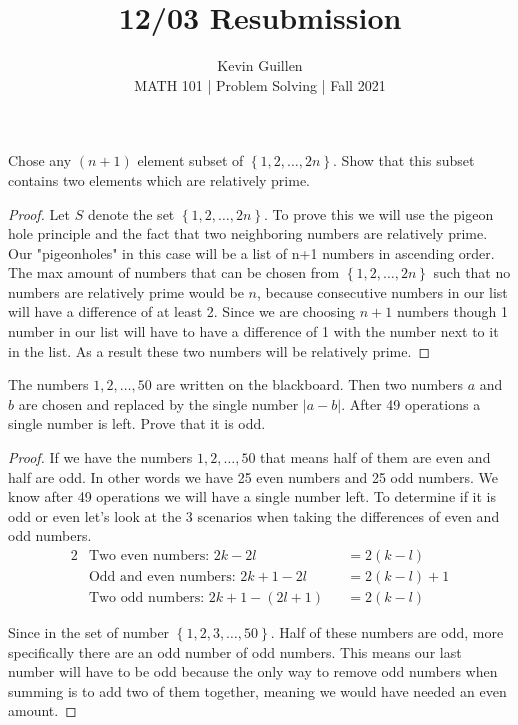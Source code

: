 \documentclass[11pt]{article}
\newenvironment{problem}[2][Problem\!]{\begin{trivlist}
\item[\hskip \labelsep {\bfseries #1}\hskip \labelsep {\bfseries #2}]}{\end{trivlist}}
\newcommand{\abs}[1]{\left\lvert#1\right\rvert} %
\newcommand{\set}[1]{\left\{#1\right\}} %
\begin{document}
 
\title{12/03 Resubmission}
\author{Kevin Guillen\\[0.5em]
MATH 101 | Problem Solving | Fall 2021}
\date{} 
\maketitle


\begin{tcolorbox}
    \begin{problem}{10/8 | OC | 30. }
        Chose any $(n+1)$ element subset of $\set{1,2,\dots, 2n}$. Show that this subset contains two elements which are relatively prime. 
    \end{problem}
\end{tcolorbox}
\begin{proof}
    Let $S$ denote the set $\set{1,2,\dots,2n}$. To prove this we will use the pigeon hole principle and the fact that two neighboring numbers are relatively prime. Our "pigeonholes" in this case will be a list of n+1 numbers in ascending order.  The max amount of numbers that can be chosen from $\set{1,2, \dots , 2n}$ such that no numbers are relatively prime would be $n$, because consecutive numbers in our list will have a difference of at least 2. Since we are choosing $n+1$ numbers though 1 number in our list will have to have a difference of 1 with the number next to it in the list. As a result these two numbers will be relatively prime. 
\end{proof}

\begin{tcolorbox}
    \begin{problem}{10/11 IC (44.)} 
        The numbers $1,2,\dots, 50$ are written on the blackboard. Then two numbers $a$ and $b$ are chosen and replaced by the single number $\abs{a-b}$. After 49 operations a single number is left. Prove that it is odd. 
    \end{problem}
\end{tcolorbox}

\begin{proof}
    If we have the numbers $1,2,\dots, 50$ that means half of them are even and half are odd. In other words we have 25 even numbers and 25 odd numbers. We know after 49 operations we will have a single number left. To determine if it is odd or even let's look at the 3 scenarios when taking the differences of even and odd numbers.
    \begin{alignat*}{2}
        &\text{Two even numbers: } 2k - 2l &&= 2(k-l) \\
        &\text{Odd and even numbers: } 2k + 1 - 2l &&= 2(k-l) + 1 \\
        &\text{Two odd numbers: } 2k + 1 - (2l + 1) &&= 2(k-l)
    \end{alignat*}

    Since in the set of number $\set{1,2, 3, \dots, 50}$. Half of these numbers are odd, more specifically there are an odd number of odd numbers. This means our last number will have to be odd because the only way to remove odd numbers when summing is to add two of them together, meaning we would have needed an even amount.
\end{proof}
\newpage
\end{document}

